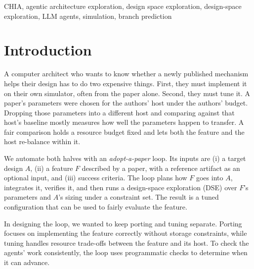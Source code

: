 \documentclass[conference]{IEEEtran}
\begin{document}
\begin{IEEEkeywords}
CHIA, agentic architecture exploration, design space exploration, design-space exploration, LLM agents, simulation, branch prediction
\end{IEEEkeywords}

\section{Introduction}

A computer architect who wants to know whether a newly published mechanism
helps their design has to do two expensive things. First, they must implement
it on their own simulator, often from the paper alone. Second, they must tune
it. A paper's parameters were chosen for the authors' host under the authors'
budget. Dropping those parameters into a different host and comparing against
that host's baseline mostly measures how well the parameters happen to
transfer. A fair comparison holds a resource budget fixed and lets both the
feature and the host re-balance within it.

We automate both halves with an \emph{adopt-a-paper} loop. Its inputs are (i) a
target design $A$, (ii) a feature $F$ described by a paper, with a reference
artifact as an optional input, and (iii) success criteria. The loop plans how
$F$ goes into $A$, integrates it, verifies it, and then runs a design-space
exploration (DSE) over $F$'s parameters and $A$'s sizing under a constraint
set. The result is a tuned configuration that can be used to fairly evaluate the feature.


In designing the loop, we wanted to keep porting and tuning separate. Porting focuses on implementing the feature correctly without storage constraints, while tuning handles resource trade-offs between the feature and its host. To check the agents' work consistently, the loop uses programmatic checks to determine when it can advance.
\end{document}
